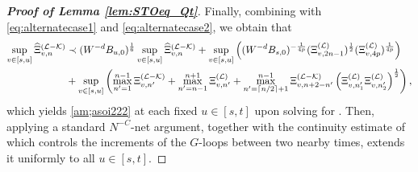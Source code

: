 \begin{proof}[\bf Proof of Lemma \ref{lem:STOeq_Qt}]


Finally, combining  with \eqref{eq:alternatecase1} and \eqref{eq:alternatecase2}, we obtain that 
\begin{align*}
\sup_{v\in[s,u]} \widehat\Xi^{({\mathcal L-\mathcal K})}_{v,n} &\prec (W^{-d}B_{u,0})^{\frac{1}{6}}\sup_{v\in [s,u]}
   \widehat\Xi^{(\mathcal L-\mathcal K)}_{v, n}  + \sup_{v\in[s,u]} \left((W^{-d}B_{s,0})^{-\frac{1}{4p}}(\Xi^{(\mathcal L)}_{v, {2n-1}})^{\frac 1 2}(\Xi^{(\mathcal L)}_{v, 4p})^{\frac{1}{4p}}\right)\\
&+\sup_{v\in [s,u]}
  \left(\max_{n'=1}^{n-1} \Xi^{({\mathcal L-\mathcal K})}_{v,n'}+ \max_{n'=n-1}^{n+1} \Xi^{({\mathcal L})}_{v,n'} + \max_{n'=\lceil n/2\rceil + 1}^{n-1} \Xi^{({\mathcal L-\mathcal K})}_{v,n+2-n'} \left({\Xi^{({\mathcal L})}_{v,n_1'} \Xi^{({\mathcal L})}_{v,n_2'}}\right)^{\frac 12 } \right),\nonumber
\end{align*}
which yields \eqref{am;asoi222} at each fixed $u\in[s,t]$ upon solving for . Then, applying a standard $N^{-C}$-net argument, together with the continuity estimate of  which controls the increments of the $G$-loops between two nearby times, extends it uniformly to all $u\in [s,t]$. 
\end{proof}

